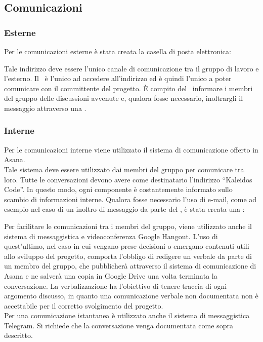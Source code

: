 \documentclass[../NormeDiProgetto.tex]{subfiles}
\begin{document}
		\subsection{Comunicazioni}
			\subsubsection{Esterne}
				Per le comunicazioni esterne è stata creata la casella di posta
				elettronica:
				\begin{center}
					\mailkaleidoscode
				\end{center}
				Tale indirizzo deve essere l'unico canale di comunicazione tra il
				gruppo di lavoro e l'esterno.
				Il \responsabilediprogetto\ è l'unico ad accedere
				all'indirizzo ed è quindi l'unico a poter comunicare con il
				committente del progetto. È compito del \responsabilediprogetto\ informare
				i membri del gruppo delle discussioni avvenute e,
				qualora fosse necessario, inoltrargli il messaggio attraverso
				una .
			\subsubsection{Interne}
				Per le comunicazioni interne viene utilizzato il sistema di
				comunicazione offerto in Asana.\\
				Tale sistema deve essere utilizzato dai membri del gruppo
				per comunicare tra loro. Tutte le conversazioni devono avere
				come destinatario l'indirizzo ``Kaleidos Code''.
				In questo modo, ogni componente è costantemente informato sullo
				scambio di informazioni interne.
				Qualora fosse necessario l'uso di e-mail, come ad esempio nel caso di
				un inoltro di messaggio da parte del \responsabilediprogetto, è stata creata una :
				\begin{center}
					\mailinglist
				\end{center}
				Per facilitare le comunicazioni tra i membri del gruppo, viene
				utilizzato anche il sistema di messaggistica e videoconferenza
				Google Hangout.
				L'uso di quest'ultimo, nel caso in cui
				vengano prese decisioni	o emergano contenuti utili allo
				sviluppo del progetto, comporta l'obbligo di redigere un verbale
				da parte di un membro del gruppo, che pubblicherà attraverso il sistema
				di comunicazione di Asana e ne salverà una copia in Google Drive una volta
				terminata la conversazione. La verbalizzazione ha l'obiettivo di tenere
				traccia di ogni argomento discusso, in
				quanto una comunicazione verbale non documentata non è
				accettabile per il corretto svolgimento del progetto.\\
				Per una comunicazione istantanea è utilizzato anche il sistema
				di messaggistica Telegram. Si richiede che la conversazione
				venga documentata come sopra descritto.
\end{document}

